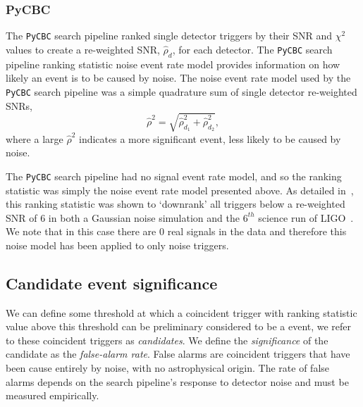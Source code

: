 \subsubsection{\label{2:sec:pycbc-2016}PyCBC}

The \texttt{PyCBC} search pipeline ranked single detector triggers by their SNR and $\chi^{2}$ values to create a re-weighted SNR, $\hat{\rho}_{d}$, for each detector. The \texttt{PyCBC} search pipeline ranking statistic noise event rate model provides information on how likely an event is to be caused by noise. The noise event rate model used by the \texttt{PyCBC} search pipeline was a simple quadrature sum of single detector re-weighted SNRs,
%
\begin{equation}
    \hat{\rho}^{2} = \sqrt{\hat{\rho}^{2}_{d_{1}} + \hat{\rho}^{2}_{d_{2}}},
    \label{2:eq:PyCBC_noise_model}
\end{equation}
%
where a large $\hat{\rho}^{2}$ indicates a more significant event, less likely to be caused by noise.

The \texttt{PyCBC} search pipeline had no signal event rate model, and so the ranking statistic was simply the noise event rate model presented above. As detailed in~\cite{PyCBC:2016}, this ranking statistic was shown to `downrank' all triggers below a re-weighted SNR of $6$ in both a Gaussian noise simulation and the $6^{th}$ science run of LIGO~\cite{rw_snr_eq:2012}. We note that in this case there are $0$ real signals in the data and therefore this noise model has been applied to only noise triggers.

\subsection{\label{2:sec:background-estimation}Candidate event significance}

We can define some threshold at which a coincident trigger with ranking statistic value above this threshold can be preliminary considered to be a \gwadj event, we refer to these coincident triggers as \textit{candidates}. We define the \textit{significance} of the candidate as the \textit{false-alarm rate}. False alarms are coincident triggers that have been cause entirely by noise, with no astrophysical origin. The rate of false alarms depends on the search pipeline's response to detector noise and must be measured empirically.

